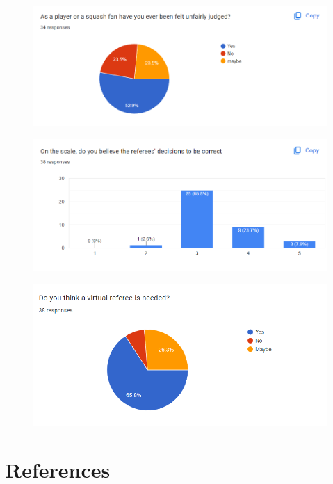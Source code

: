 \documentclass[12pt]{article}
\begin{document}
    \begin{figure}[H]
    \centering
    \includegraphics[width=0.7\linewidth]{figures/unfairly judged.png}
    \label{fig:Question 4}
    \end{figure}
    
    \begin{figure}[H]
    \centering
    \includegraphics[width=0.7\linewidth]{figures/to be correct.png}
    \label{fig:Question 5}
    \end{figure}
    
    \begin{figure}[H]
    \centering
    \includegraphics[width=0.7\linewidth]{figures/virtual referee.png}
    \label{fig:Question 6}
    \end{figure}

% 
% 
\section {References}
\printbibliography
\end{document}
